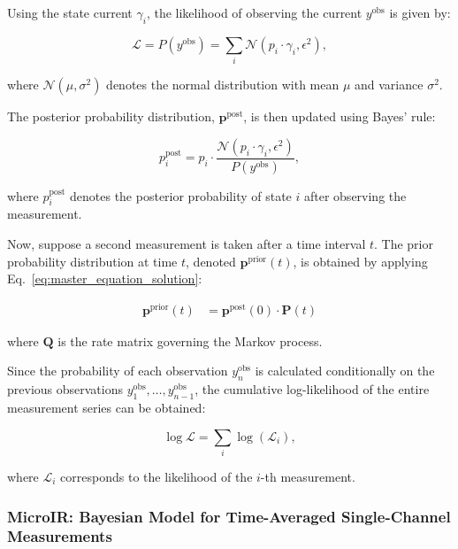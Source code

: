 \documentclass[pdflatex,sn-mathphys-num]{sn-jnl}%
\theoremstyle{thmstyleone}%
\theoremstyle{thmstyletwo}%
\theoremstyle{thmstylethree}%
\begin{document}
Using the state current $\gamma_i$, the likelihood of observing the current \( y^{\text{obs}} \) is given by:

\begin{equation}
	\mathcal{L} = P(y^{\text{obs}}) = \sum_i \mathcal{N}(p_i \cdot \gamma_i, \epsilon^2),
	\label{eq:single_channel_likelihood}
\end{equation}

where \( \mathcal{N}(\mu, \sigma^2) \) denotes the normal distribution with mean \( \mu \) and variance \( \sigma^2 \).

The posterior probability distribution, \( \boldsymbol{p}^{\text{post}} \), is then updated using Bayes' rule:

\begin{equation}
	p^{\text{post}}_i = p_i \cdot \frac{\mathcal{N}(p_i \cdot \gamma_i, \epsilon^2)}{P(y^{\text{obs}})},
	\label{eq:single_channel_posterior}
\end{equation}

where \( p^{\text{post}}_i \) denotes the posterior probability of state \( i \) after observing the measurement.

Now, suppose a second measurement is taken after a time interval \( t \). The prior probability distribution at time \( t \), denoted \( \boldsymbol{p}^{\text{prior}}(t) \), is obtained by applying Eq.~\ref{eq:master_equation_solution}:

\begin{align}
	\boldsymbol{p}^{\text{prior}}(t) &= \boldsymbol{p}^{\text{post}}(0) \cdot \boldsymbol{P}(t)
	\label{eq:prior_update}
\end{align}

where \( \boldsymbol{Q} \) is the rate matrix governing the Markov process.

Since the probability of each observation \( {y}_n^{\text{obs}} \) is calculated conditionally on the previous observations \( {y}_1^{\text{obs}}, \dots, {y}_{n-1}^{\text{obs}} \), the cumulative log-likelihood of the entire measurement series can be obtained:

\begin{equation}
	\log \mathcal{L} = \sum_i \log (\mathcal{L}_i),
	\label{eq:total_loglikelihood}
\end{equation}

where \( \mathcal{L}_i \) corresponds to the likelihood of the \( i \)-th measurement.


\subsubsection{MicroIR: Bayesian Model for Time-Averaged Single-Channel Measurements}
\end{document}
